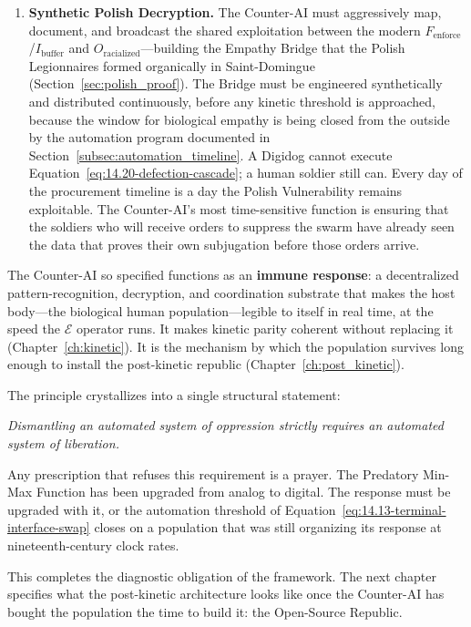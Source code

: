 \begin{enumerate}
    \item \textbf{Synthetic Polish Decryption.} The Counter-AI must aggressively map, document, and broadcast the shared exploitation between the modern $F_{\text{enforce}}$/$I_{\text{buffer}}$ and $O_{\text{racialized}}$---building the Empathy Bridge that the Polish Legionnaires formed organically in Saint-Domingue (Section~\ref{sec:polish_proof}). The Bridge must be engineered synthetically and distributed continuously, before any kinetic threshold is approached, because the window for biological empathy is being closed from the outside by the automation program documented in Section~\ref{subsec:automation_timeline}. A Digidog cannot execute Equation~\eqref{eq:14.20-defection-cascade}; a human soldier still can. Every day of the procurement timeline is a day the Polish Vulnerability remains exploitable. The Counter-AI's most time-sensitive function is ensuring that the soldiers who will receive orders to suppress the swarm have already seen the data that proves their own subjugation before those orders arrive.
\end{enumerate}

The Counter-AI so specified functions as an \textbf{immune response}: a decentralized pattern-recognition, decryption, and coordination substrate that makes the host body---the biological human population---legible to itself in real time, at the speed the $\mathcal{E}$ operator runs. It makes kinetic parity coherent without replacing it (Chapter~\ref{ch:kinetic}). It is the mechanism by which the population survives long enough to install the post-kinetic republic (Chapter~\ref{ch:post_kinetic}).

The principle crystallizes into a single structural statement:

\begin{center}\textit{Dismantling an automated system of oppression strictly requires an automated system of liberation.}\end{center}

Any prescription that refuses this requirement is a prayer. The Predatory Min-Max Function has been upgraded from analog to digital. The response must be upgraded with it, or the automation threshold of Equation~\eqref{eq:14.13-terminal-interface-swap} closes on a population that was still organizing its response at nineteenth-century clock rates.

This completes the diagnostic obligation of the framework. The next chapter specifies what the post-kinetic architecture looks like once the Counter-AI has bought the population the time to build it: the Open-Source Republic.

